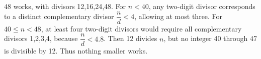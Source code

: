 $\boxed{48}$ works, with divisors 12,16,24,48. For $n<40$, any two-digit divisor corresponds to a distinct complementary divisor $\dfrac{n}{d}<4$, allowing at most three. For $40\le n<48$, at least four two-digit divisors would require all complementary divisors 1,2,3,4, because $\dfrac{n}{d}<4.8$. Then 12 divides $n$, but no integer 40 through 47 is divisible by 12. Thus nothing smaller works.
